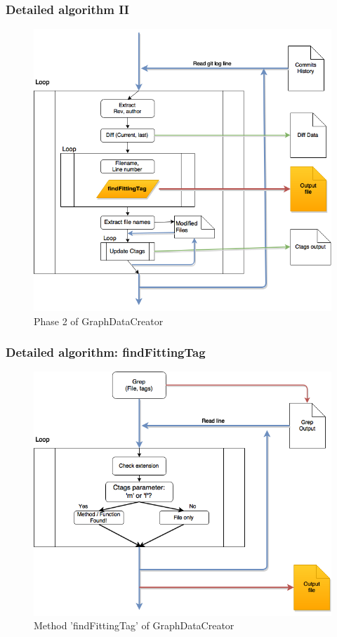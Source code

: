 \documentclass{beamer}
\begin{document}

\begin{frame}
\frametitle{Detailed algorithm II}
\begin{figure}
\includegraphics[scale=0.3]{GDCphase2.png} 
\caption{Phase 2 of GraphDataCreator}
\label{fig:phase2}
\end{figure}
\end{frame}


\begin{frame}
\frametitle{Detailed algorithm: findFittingTag}
\begin{figure}
\includegraphics[scale=0.3]{GDCfft.png} 
\caption{Method 'findFittingTag' of GraphDataCreator}
\label{fig:phasefft}
\end{figure}
\end{frame}
\end{document}
